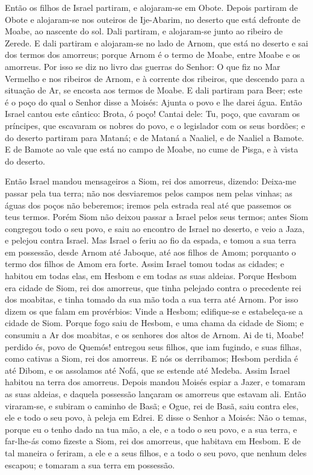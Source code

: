Então os filhos de Israel partiram, e alojaram-se em Obote.
Depois partiram de Obote e alojaram-se nos outeiros de
Ije-Abarim, no deserto que está defronte de Moabe, ao nascente do
sol. Dali partiram, e alojaram-se junto ao ribeiro de Zerede.
E dali partiram e alojaram-se no lado de Arnom, que está no
deserto e sai dos termos dos amorreus; porque Arnom é o termo de
Moabe, entre Moabe e os amorreus. Por isso se diz no livro
das guerras do Senhor: O que fiz no Mar Vermelho e nos ribeiros de
Arnom, e à corrente dos ribeiros, que descendo para a
situação de Ar, se encosta aos termos de Moabe. E dali
partiram para Beer; este é o poço do qual o Senhor disse a Moisés:
Ajunta o povo e lhe darei água. Então Israel cantou este
cântico: Brota, ó poço! Cantai dele: Tu, poço, que cavaram os
príncipes, que escavaram os nobres do povo, e o legislador com os
seus bordões; e do deserto partiram para Mataná; e de Mataná
a Naaliel, e de Naaliel a Bamote. E de Bamote ao vale que
está no campo de Moabe, no cume de Pisga, e à vista do deserto.

Então Israel mandou mensageiros a Siom, rei dos amorreus,
dizendo: Deixa-me passar pela tua terra; não nos desviaremos
pelos campos nem pelas vinhas; as águas dos poços não beberemos;
iremos pela estrada real até que passemos os teus termos.
Porém Siom não deixou passar a Israel pelos seus termos;
antes Siom congregou todo o seu povo, e saiu ao encontro de Israel
no deserto, e veio a Jaza, e pelejou contra Israel. Mas
Israel o feriu ao fio da espada, e tomou a sua terra em possessão,
desde Arnom até Jaboque, até aos filhos de Amom; porquanto o termo
dos filhos de Amom era forte. Assim Israel tomou todas as
cidades; e habitou em todas elas, em Hesbom e em todas as suas
aldeias. Porque Hesbom era cidade de Siom, rei dos amorreus,
que tinha pelejado contra o precedente rei dos moabitas, e tinha
tomado da sua mão toda a sua terra até Arnom. Por isso dizem
os que falam em provérbios: Vinde a Hesbom; edifique-se e
estabeleça-se a cidade de Siom. Porque fogo saiu de Hesbom, e
uma chama da cidade de Siom; e consumiu a Ar dos moabitas, e os
senhores dos altos de Arnom. Ai de ti, Moabe! perdido és,
povo de Quemós! entregou seus filhos, que iam fugindo, e suas
filhas, como cativas a Siom, rei dos amorreus. E nós os
derribamos; Hesbom perdida é até Dibom, e os assolamos até Nofá, que
se estende até Medeba. Assim Israel habitou na terra dos
amorreus. Depois mandou Moisés espiar a Jazer, e tomaram as
suas aldeias, e daquela possessão lançaram os amorreus que estavam
ali. Então viraram-se, e subiram o caminho de Basã; e Ogue,
rei de Basã, saiu contra eles, ele e todo o seu povo, à peleja em
Edrei. E disse o Senhor a Moisés: Não o temas, porque eu o
tenho dado na tua mão, a ele, e a todo o seu povo, e a sua terra, e
far-lhe-ás como fizeste a Siom, rei dos amorreus, que habitava em
Hesbom. E de tal maneira o feriram, a ele e a seus filhos, e
a todo o seu povo, que nenhum deles escapou; e tomaram a sua terra
em possessão.

